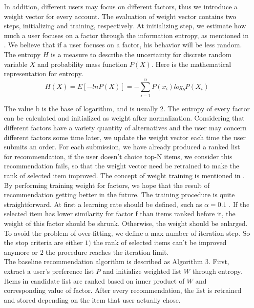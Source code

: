 \documentclass{sig-alternate-05-2015}
\begin{document}
In addition, different users may focus on different factors, thus we introduce a weight vector for every account. The evaluation of weight vector contains two steps, initializing and training, respectively. At initializing step, we estimate how much a user focuses on a factor through the information entropy, as mentioned in \cite{yang:pers}. We believe that if a user focuses on a factor, his behavior will be less random. The entropy $H$ is a measure to describe the uncertainty for discrete random variable $X$ and probability mass function $P(X)$. Here is the mathematical representation for entropy.\\
\begin{equation}
H(X)=E[-lnP(X)]= - \sum_{i-1}^n P(x_i)log_bP(X_i)
\end{equation}\par
The value b is the base of logarithm, and is usually 2. The entropy of every factor can be calculated and initialized as weight after normalization. Considering that different factors have a variety quantity of alternatives and the user may concern different factors some time later, we update the weight vector each time the user submits an order. For each submission, we have already produced a ranked list for recommendation, if the user doesn't choice top-N items, we consider this recommendation fails, so that the weight vector need be retrained to make the rank of selected item improved. The concept of weight training is mentioned in \cite{lor:flight}. By performing training weight for factors, we hope that the result of recommendation getting better in the future. The training procedure is quite straightforward. At first a learning rate should be defined, such as $\alpha = 0.1$ . If the selected item has lower similarity for factor f than items ranked before it, the weight of this factor should be shrunk. Otherwise, the weight should be enlarged. To avoid the problem of over-fitting, we define a max number of iteration step. So the stop criteria are either $1)$ the rank of selected items can't be improved anymore or $2$ the procedure reaches the iteration limit.\\
The baseline recommendation algorithm is described as Algorithm 3. First, extract a user's preference list $P$ and initialize weighted list $W$ through entropy. Items in candidate list are ranked based on inner product of $W$ and corresponding value of factor. After every recommendation, the list is retrained and stored depending on the item that user actually chose.
\end{document}
